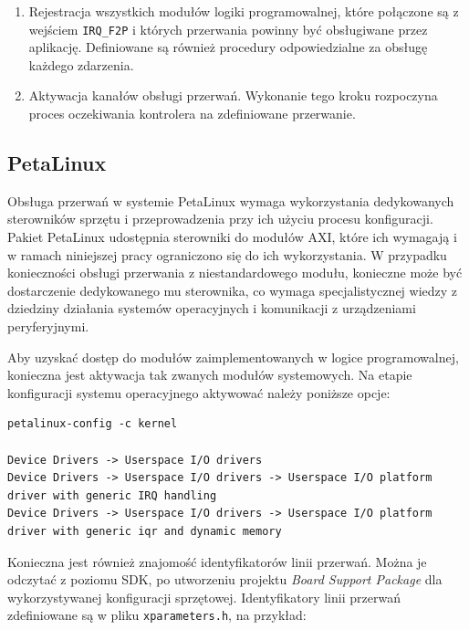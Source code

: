 \begin{enumerate}
\begin{enumerate}
	\item Rejestracja wszystkich modułów logiki programowalnej, które połączone są z wejściem \texttt{IRQ\_F2P} i których przerwania powinny być obsługiwane przez aplikację. Definiowane są również procedury odpowiedzialne za obsługę każdego zdarzenia.
	
	\item Aktywacja kanałów obsługi przerwań. Wykonanie tego kroku rozpoczyna proces oczekiwania kontrolera na zdefiniowane przerwanie.
\end{enumerate}
\end{enumerate}


\subsection{PetaLinux}

Obsługa przerwań w systemie PetaLinux wymaga wykorzystania dedykowanych sterowników sprzętu i przeprowadzenia przy ich użyciu procesu konfiguracji.
Pakiet PetaLinux udostępnia sterowniki do modułów AXI, które ich wymagają i w ramach niniejszej pracy ograniczono się do ich wykorzystania. 
W przypadku konieczności obsługi przerwania z niestandardowego modułu, konieczne może być dostarczenie dedykowanego mu sterownika, co wymaga specjalistycznej wiedzy z dziedziny działania systemów operacyjnych i komunikacji z urządzeniami peryferyjnymi. %

Aby uzyskać dostęp do modułów zaimplementowanych w logice programowalnej, konieczna jest aktywacja tak zwanych modułów systemowych. %
Na etapie konfiguracji systemu operacyjnego aktywować należy poniższe opcje:

\begin{lstlisting}[breaklines=true, caption=Konfiguracja modułów systemowych.]
petalinux-config -c kernel

Device Drivers -> Userspace I/O drivers
Device Drivers -> Userspace I/O drivers -> Userspace I/O platform driver with generic IRQ handling
Device Drivers -> Userspace I/O drivers -> Userspace I/O platform driver with generic iqr and dynamic memory
\end{lstlisting}

Konieczna jest również znajomość identyfikatorów linii przerwań. 
Można je odczytać z poziomu SDK, po utworzeniu projektu \emph{Board Support Package} dla wykorzystywanej konfiguracji sprzętowej. 
Identyfikatory linii przerwań zdefiniowane są w pliku \texttt{xparameters.h}, na przykład:

